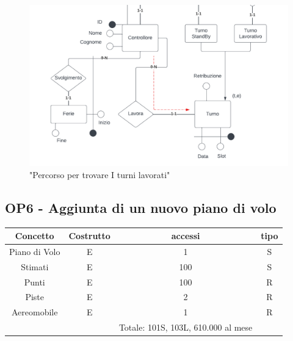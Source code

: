     \begin{figure}[H]
      \centering
      \includegraphics[width=1\textwidth]{figures/BasicControllerarrowsp2.pdf}
      \caption{"Percorso per trovare I turni lavorati"}
    \end{figure}

    \subsection*{OP6 - Aggiunta di un nuovo piano di volo}
    \begin{table}[H]
    \centering
    \begin{tabular}{|c|c|c|c|}
    \hline
    \rowcolor{green!70!black!80}
    \textbf{Concetto} & \textbf{Costrutto} & \textbf{accessi} & \textbf{tipo}\\
    \hline
    Piano di Volo & E & 1 & S \\
    Stimati & E & 100 & S \\
    Punti & E & 100 & R \\
    Piste & E & 2 & R \\
    Aereomobile & E & 1 & R \\
    & & Totale: 101S, 103L, 610.000 al mese &\\
    \hline
    \end{tabular}
    \end{table}

